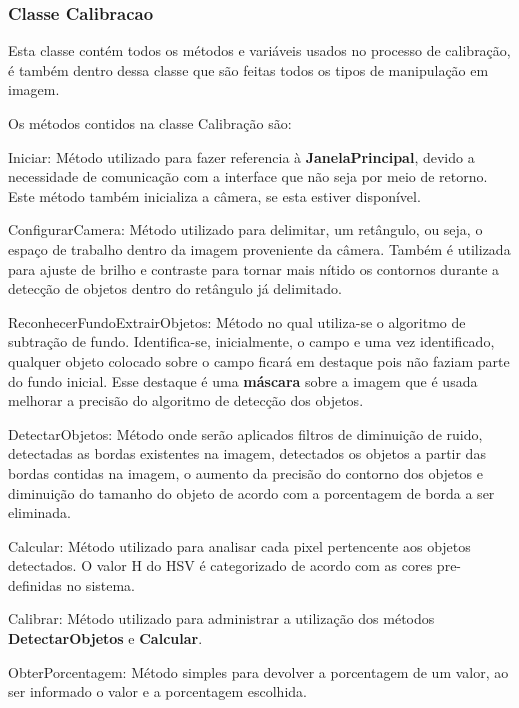 \subsubsection{Classe Calibracao}
 Esta classe contém todos os métodos e variáveis usados no processo de calibração, é também dentro dessa classe que são feitas todos os tipos de manipulação em imagem.
 
Os métodos contidos na classe Calibração são:
	\begin{description}

\item Iniciar: Método utilizado para fazer referencia à \textbf{JanelaPrincipal}, devido a necessidade de comunicação com a interface que não seja por meio de retorno. Este método também inicializa a câmera, se esta estiver disponível.

\item ConfigurarCamera: Método utilizado para delimitar, um retângulo, ou seja, o espaço de trabalho dentro da imagem proveniente da câmera. Também é utilizada para ajuste de brilho e contraste para tornar mais nítido os contornos durante a detecção de objetos dentro do retângulo já delimitado.	
	
  \item ReconhecerFundoExtrairObjetos: Método no qual utiliza-se o algoritmo de subtração de fundo. Identifica-se, inicialmente, o campo e uma vez identificado, qualquer objeto colocado sobre o campo ficará em destaque pois não faziam parte do fundo inicial. Esse destaque é uma \textbf{máscara} sobre a imagem que é usada melhorar a precisão do algoritmo de detecção dos objetos.
  
 	\item DetectarObjetos: Método onde serão aplicados filtros de diminuição de ruido, detectadas as bordas existentes na imagem, detectados os objetos a partir das bordas contidas na imagem, o aumento da precisão do contorno dos objetos e diminuição do tamanho do objeto de acordo com a porcentagem de borda a ser eliminada. 

\item Calcular: Método utilizado para analisar cada pixel pertencente aos objetos detectados. O valor H do HSV é categorizado de acordo com as cores pre-definidas no sistema. %

\item Calibrar: Método utilizado para administrar a utilização dos métodos \textbf{DetectarObjetos} e \textbf{Calcular}. %

	\item ObterPorcentagem: Método simples para devolver a porcentagem de um valor, ao ser informado o valor e a porcentagem escolhida.
		
		
	
		\end{description}	

